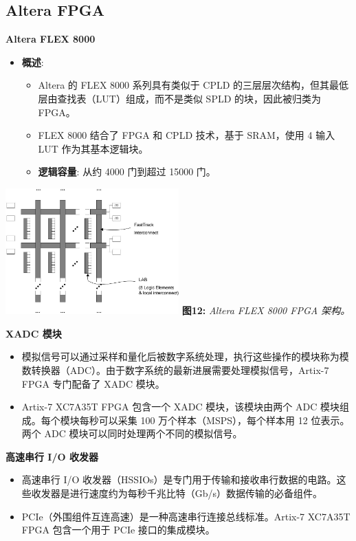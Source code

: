 \subsection{Altera FPGA}
\begin{frame}{\textbf{Altera FLEX 8000}}
\label{altera-flex-8000}
\begin{itemize}
\tightlist
\item
    \textbf{概述}:

    \begin{itemize}
    \tightlist
    \item
    Altera 的 FLEX 8000 系列具有类似于 CPLD
    的三层层次结构，但其最低层由查找表（LUT）组成，而不是类似 SPLD
    的块，因此被归类为 FPGA。
    \item
    FLEX 8000 结合了 FPGA 和 CPLD 技术，基于 SRAM，使用 4 输入 LUT
    作为其基本逻辑块。
    \item
    \textbf{逻辑容量}: 从约 4000 门到超过 15000 门。
    \end{itemize}
\end{itemize}

\includegraphics[width=0.5\textwidth]{img1/FLEX800.jpeg}
\textbf{图12:} \emph{Altera FLEX 8000 FPGA 架构。}
\end{frame}

\begin{frame}{\textbf{XADC 模块}}
\begin{itemize}
\tightlist
\item
    模拟信号可以通过采样和量化后被数字系统处理，执行这些操作的模块称为模数转换器（ADC）。由于数字系统的最新进展需要处理模拟信号，Artix-7
    FPGA 专门配备了 XADC 模块。
\item
    Artix-7 XC7A35T FPGA 包含一个 XADC 模块，该模块由两个 ADC
    模块组成。每个模块每秒可以采集 100 万个样本（MSPS），每个样本用 12
    位表示。两个 ADC 模块可以同时处理两个不同的模拟信号。
\end{itemize}
\end{frame}

\begin{frame}{\textbf{高速串行 I/O 收发器}}
\begin{itemize}
\item
    高速串行 I/O
    收发器（HSSIOs）是专门用于传输和接收串行数据的电路。这些收发器是进行速度约为每秒千兆比特（Gb/s）数据传输的必备组件。
\item
    PCIe（外围组件互连高速）是一种高速串行连接总线标准。Artix-7 XC7A35T
    FPGA 包含一个用于 PCIe 接口的集成模块。
\end{itemize}
\end{frame}

